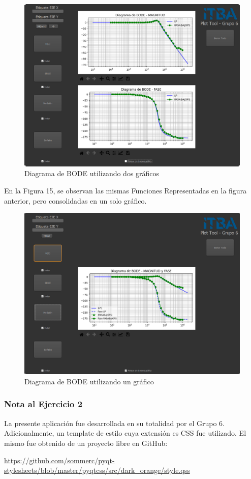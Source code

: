 \begin{figure}[!htb] 
    \centering 
    \includegraphics [width=0.8
    \textwidth] {../EJ2/LatexScreenshots/plotToolDosGraficos.png} 
    \caption{Diagrama de BODE utilizando dos gráficos}
    \label{fig:checkBoxPlotTool}
\end{figure}

En la Figura 15, se observan las mismas Funciones Representadas en la figura anterior, pero consolidadas en un solo gráfico.

\begin{figure}[!htb] 
    \centering 
    \includegraphics [width=0.8
    \textwidth] {../EJ2/LatexScreenshots/plotToolUnGrafico.png} 
    \caption{Diagrama de BODE utilizando un gráfico}
    \label{fig:checkBoxPlotTool}
\end{figure}

\subsubsection{Nota al Ejercicio 2}

La presente aplicación fue desarrollada en su totalidad por el Grupo 6. Adicionalmente, un template de estilo cuya extensión es CSS fue utilizado. El mismo fue obtenido de un proyecto libre en GitHub:

\url{https://github.com/sommerc/pyqt-stylesheets/blob/master/pyqtcss/src/dark_orange/style.qss}